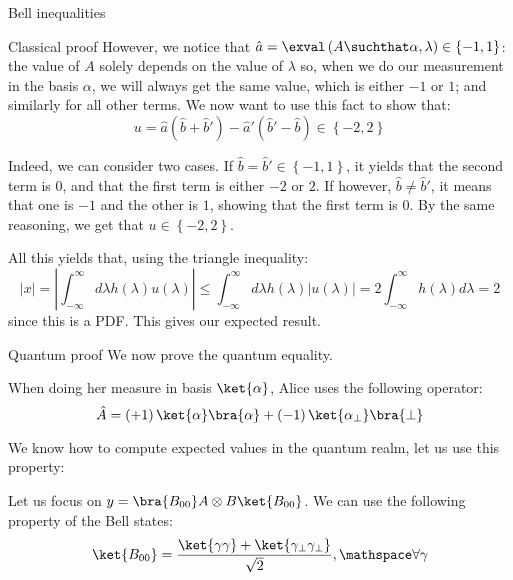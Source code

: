 \documentclass[a4paper]{article}
\begin{document}
\begin{parag}{Bell inequalities}
\begin{subparag}{Classical proof}
        However, we notice that $\hat{a} = \exval\left(A \suchthat \alpha, \lambda\right) \in \left\{-1, 1\right\}$: the value of $A$ solely depends on the value of $\lambda$ so, when we do our measurement in the basis $\alpha$, we will always get the same value, which is either $-1$ or $1$; and similarly for all other terms. We now want to use this fact to show that: 
        \[u = \hat{a}\left(\hat{b} + \hat{b}'\right) - \hat{a}' \left(\hat{b}' - \hat{b}\right) \in \left\{-2, 2\right\}\]
        
        Indeed, we can consider two cases. If $\hat{b} = \hat{b}' \in \left\{-1, 1\right\}$, it yields that the second term is 0, and that the first term is either $-2$ or $2$. If however, $\hat{b} \neq \hat{b}'$, it means that one is $-1$ and the other is $1$, showing that the first term is $0$. By the same reasoning, we get that $u \in \left\{-2, 2\right\}$.

        All this yields that, using the triangle inequality: 
        \[\left|x\right| = \left|\int_{-\infty}^{\infty} d\lambda h\left(\lambda\right) u\left(\lambda\right)\right| \leq \int_{-\infty}^{\infty} d\lambda h\left(\lambda\right) \left|u\left(\lambda\right)\right| = 2 \int_{-\infty}^{\infty} h\left(\lambda\right) d\lambda = 2\]
        since this is a PDF. This gives our expected result.
    \end{subparag}

    \begin{subparag}{Quantum proof}
        We now prove the quantum equality.

        When doing her measure in basis $\ket{\alpha}$, Alice uses the following operator: 
        \[\hat{A} = \left(+1\right) \ket{\alpha}\bra{\alpha} + \left(-1\right)\ket{\alpha_{\perp}} \bra{\perp}\]
        
        We know how to compute expected values in the quantum realm, let us use this property:
        
        Let us focus on $y = \bra{B_{00}} A \otimes B \ket{B_{00}}$. We can use the following property of the Bell states: 
        \[\ket{B_{00}} = \frac{\ket{\gamma \gamma} + \ket{\gamma_{\perp} \gamma_{\perp}}}{\sqrt{2}}, \mathspace \forall \gamma\]


\end{subparag}
\end{parag}
\end{document}
